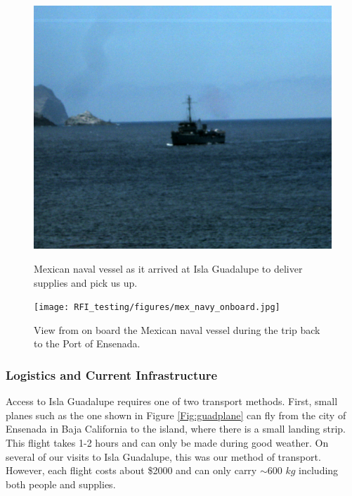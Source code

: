 \begin{figure}[htb]
\centering
\begin{minipage}[b]{0.43\textwidth}
\centering
\includegraphics[width=0.95\linewidth]{RFI_testing/figures/mex_navy_arrival.jpg}
\caption{Mexican naval vessel as it arrived at Isla Guadalupe to deliver supplies and pick us up.}
\label{Fig:guadboat}
\end{minipage}%
\begin{minipage}[b]{0.02\textwidth}
\hspace{1cm}
\end{minipage}%
\begin{minipage}[b]{0.51\textwidth}
\centering
\texttt{[image: RFI\_testing/figures/mex\_navy\_onboard.jpg]}
\caption{View from on board the Mexican naval vessel during the trip back to the Port of Ensenada.}
\label{Fig:guadonboard}
\end{minipage}
\end{figure}

\subsubsection{Logistics and Current Infrastructure}

Access to Isla Guadalupe requires one of two transport methods. First, small planes such as the one shown in Figure \ref{Fig:guadplane} can fly from the city of Ensenada in Baja California to the island, where there is a small landing strip. This flight takes 1-2 hours and can only be made during good weather. On several of our visits to Isla Guadalupe, this was our method of transport. However, each flight costs about \$2000 and can only carry $\sim$600 $kg$ including both people and supplies. 

